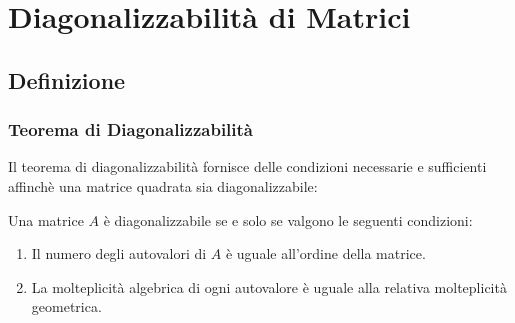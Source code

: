 \chapter{Diagonalizzabilità di Matrici}
\section{Definizione}
\subsection{Teorema di Diagonalizzabilità}
Il teorema di diagonalizzabilità fornisce delle condizioni necessarie e sufficienti affinchè una matrice quadrata sia diagonalizzabile:

Una matrice $A$ è diagonalizzabile se e solo se valgono le seguenti condizioni:
\begin{enumerate}
    \item Il numero degli autovalori di $A$ è uguale all'ordine della matrice.
    \item La molteplicità algebrica di ogni autovalore è uguale alla relativa molteplicità geometrica.
\end{enumerate}

